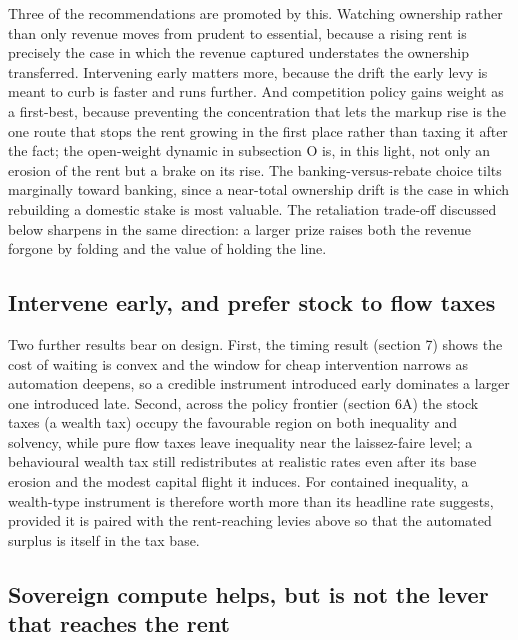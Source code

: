 \documentclass[11pt]{article}
\begin{document}
Three of the recommendations are promoted by this. Watching ownership
rather than only revenue moves from prudent to essential, because a
rising rent is precisely the case in which the revenue captured
understates the ownership transferred. Intervening early matters more,
because the drift the early levy is meant to curb is faster and runs
further. And competition policy gains weight as a first-best, because
preventing the concentration that lets the markup rise is the one route
that stops the rent growing in the first place rather than taxing it
after the fact; the open-weight dynamic in subsection O is, in this
light, not only an erosion of the rent but a brake on its rise. The
banking-versus-rebate choice tilts marginally toward banking, since a
near-total ownership drift is the case in which rebuilding a domestic
stake is most valuable. The retaliation trade-off discussed below
sharpens in the same direction: a larger prize raises both the revenue
forgone by folding and the value of holding the line.

\hypertarget{intervene-early-and-prefer-stock-to-flow-taxes}{%
\subsection{Intervene early, and prefer stock to flow
taxes}\label{intervene-early-and-prefer-stock-to-flow-taxes}}

Two further results bear on design. First, the timing result (section 7)
shows the cost of waiting is convex and the window for cheap
intervention narrows as automation deepens, so a credible instrument
introduced early dominates a larger one introduced late. Second, across
the policy frontier (section 6A) the stock taxes (a wealth tax) occupy
the favourable region on both inequality and solvency, while pure flow
taxes leave inequality near the laissez-faire level; a behavioural
wealth tax still redistributes at realistic rates even after its base
erosion and the modest capital flight it induces. For contained
inequality, a wealth-type instrument is therefore worth more than its
headline rate suggests, provided it is paired with the rent-reaching
levies above so that the automated surplus is itself in the tax base.

\hypertarget{sovereign-compute-helps-but-is-not-the-lever-that-reaches-the-rent}{%
\subsection{Sovereign compute helps, but is not the lever that reaches
the
rent}\label{sovereign-compute-helps-but-is-not-the-lever-that-reaches-the-rent}}
\end{document}
